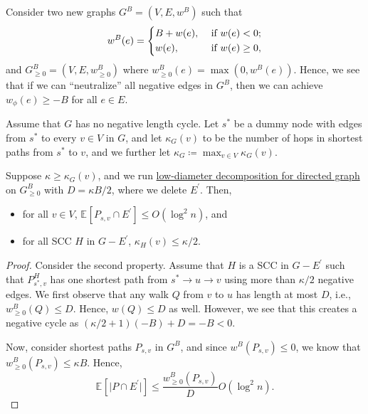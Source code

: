 Consider two new graphs \(G^B = (V, E, w^B)\) such that
\[
	w^B (e)
	= \begin{dcases}
		B + w(e), & \text{ if } w(e) < 0 ;    \\
		w(e),     & \text{ if } w(e) \geq 0 ,
	\end{dcases}
\]
and \(G^B_{\geq 0} = (V, E, w^B_{\geq 0})\) where \(w^B_{\geq 0} (e) = \max (0, w^B(e))\). Hence, we see that if we can ``neutralize'' all negative edges in \(G^B\), then we can achieve \(w_{\phi } (e) \geq -B\) for all \(e \in E\).

Assume that \(G\) has no negative length cycle. Let \(s^{\ast} \) be a dummy node with edges from \(s^{\ast} \) to every \(v \in V\) in \(G\), and let \(\kappa _G (v)\) to be the number of hops in shortest paths from \(s^{\ast} \) to \(v\), and we further let \(\kappa _G \coloneqq \max _{v \in V} \kappa _G(v)\).

\begin{lemma}
	Suppose \(\kappa \geq \kappa _G(v)\), and we run \hyperref[thm:directed-LDD]{low-diameter decomposition for directed graph} on \(G_{\geq 0}^B\) with \(D = \kappa B / 2\), where we delete \(E^{\prime} \). Then,
	\begin{itemize}
		\item for all \(v \in V\), \(\mathbb{E}_{}[P_{s, v} \cap E^{\prime} ] \leq O(\log ^2 n)\), and
		\item for all SCC \(H\) in \(G - E^{\prime} \), \(\kappa _H(v) \leq \kappa / 2\).
	\end{itemize}
\end{lemma}
\begin{proof}
	Consider the second property. Assume that \(H\) is a SCC in \(G - E^{\prime} \) such that \(P^H_{s^{\ast} , v}\) has one shortest path from \(s^{\ast} \to u \to v\) using more than \(\kappa / 2\) negative edges. We first observe that any walk \(Q\) from \(v\) to \(u\) has length at most \(D\), i.e., \(w_{\geq 0}^B(Q) \leq D\). Hence, \(w(Q) \leq D\) as well. However, we see that this creates a negative cycle as \((\kappa / 2 + 1) (-B) + D = -B < 0\).

	Now, consider shortest paths \(P_{s, v}\) in \(G^B\), and since \(w^B(P_{s, v}) \leq 0\), we know that \(w^B_{\geq 0}(P_{s, v}) \leq \kappa B\). Hence,
	\[
		\mathbb{E}_{}[\lvert P \cap E^{\prime}  \rvert ]
		\leq \frac{w_{\geq 0}^B(P_{s, v})}{D} O(\log ^2 n).
	\]

\end{proof}

